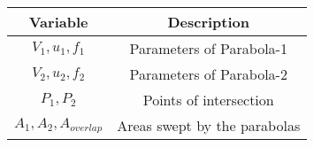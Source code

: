\begin{tabular}[12pt]{ |c| c|}
    \hline
    \textbf{Variable} & \textbf{Description}\\ 
    \hline
    $V_1,u_1,f_1$ & Parameters of Parabola-1 \\
    \hline 
    $V_2,u_2,f_2$ & Parameters of Parabola-2 \\
    \hline
     $P_1,P_2$ & Points of intersection \\
     \hline
     $A_1,A_2,A_{overlap}$ & Areas swept by the parabolas \\
    \hline
\end{tabular}
